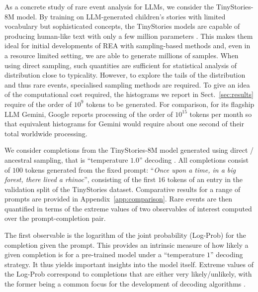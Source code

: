 \documentclass{article}
\begin{document}
As a concrete study of rare event analysis for LLMs, we consider the TinyStories-8M  model. By training on LLM-generated children's stories with limited vocabulary but sophisticated concepts, the TinyStories models
are capable of producing human-like text with only a few million parameters \cite{eldan2023tinystories:}. This makes them ideal for initial developments of REA with sampling-based methods and, even in a resource limited setting, we
are able to generate millions of samples. When using direct sampling, such quantities are sufficient for statistical analysis of distribution close to typicality. However, to explore the tails of the distribution and thus rare events, specialised sampling methods are required. To give an idea of the computational cost required, the histograms we report in Sect.~\ref{sec:results} require of the order of $10^9$ tokens to be generated. For comparison, for its flagship LLM Gemini, Google reports processing of the order of $10^{15}$ tokens per month
\cite{hassabis2025we-processed} so that equivalent histograms for Gemini would require about one second of their total worldwide processing.

We consider completions from the TinyStories-8M  model generated using direct / ancestral sampling, that is ``temperature $1.0$'' decoding \cite{shi2024a-thorough}. All completions consist of $100$ tokens generated from the fixed prompt: ``\textit{Once upon a time, in a big forest, there lived a rhinoc}'', consisting of the first $16$ tokens of an entry in the validation split of the TinyStories dataset. Comparative results for a range of prompts are provided in Appendix~\ref{app:comparison}. Rare events are then quantified in terms of the extreme values of two observables of interest computed over the prompt-completion pair.

The first observable is the logarithm of the joint probability (Log-Prob) for the completion given the prompt. This provides an intrinsic measure of how likely a given completion is for a pre-trained model under a ``temperature $1$'' decoding strategy. It thus yields important insights into the model itself. Extreme values
of the Log-Prob correspond to completions that are either very likely/unlikely, with the former being a common focus for the development of decoding algorithms \cite{shi2024a-thorough}.
\end{document}
